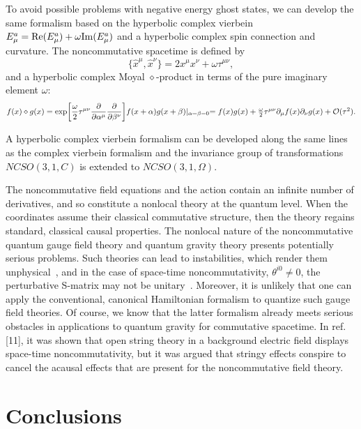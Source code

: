 \documentclass[a4paper,10pt]{article}
\begin{document}
To avoid possible problems with negative energy ghost states, we can
develop the same formalism based on the hyperbolic complex vierbein
$E^a_\mu={\rm Re}(E^a_\mu)+\omega {\rm Im}(E^a_\mu)$ and a hyperbolic
complex spin connection and curvature. The noncommutative spacetime is
defined by
\begin{equation}
\{{\hat x}^\mu, {\hat x}^\nu\}=2x^\mu x^\nu+\omega\tau^{\mu\nu},
\end{equation}
and a hyperbolic complex Moyal $\diamond$-product in terms of the pure
imaginary element $\omega$:
\begin{equation}
f(x)\diamond g(x)
=\exp\biggl[\frac{\omega}{2}\tau^{\mu\nu}\frac{\partial}{\partial\alpha^\mu}
\frac{\partial}{\partial\beta^\nu}\biggr]f(x+\alpha)g(x+\beta)\vert_{\alpha=\beta=0}
$$
$$
=f(x)g(x)+\frac{\omega}{2}\tau^{\mu\nu}\partial_\mu f(x)\partial_\nu
g(x)+{\cal O}(\tau^2).
\end{equation}

A hyperbolic complex vierbein formalism can be developed along the same
lines as the complex vierbein formalism and the invariance group of
transformations $NCSO(3,1,C)$ is extended to $NCSO(3,1,\Omega)$.

The noncommutative field equations and the action contain an infinite
number of derivatives, and so constitute a nonlocal theory at the quantum
level. When the coordinates assume their classical commutative structure,
then the theory regains standard, classical causal properties.
The nonlocal nature of the noncommutative quantum gauge field theory and
quantum gravity theory presents potentially serious problems. Such theories
can lead to instabilities, which render them
unphysical~\cite{Woodard}, and in the case of space-time
noncommutativity, $\theta^{i0}\not=0$, the perturbative S-matrix may not be
unitary~\cite{Gomis}. Moreover, it is unlikely that one can apply the
conventional, canonical Hamiltonian formalism to quantize such gauge field
theories. Of course, we know that the latter formalism already meets
serious obstacles in applications to quantum gravity for commutative
spacetime. In ref. [11], it was shown that open string theory in a 
background electric field displays space-time noncommutativity, but it was
argued that stringy effects conspire to cancel the acausal effects that are
present for the noncommutative field theory.
\section{Conclusions}
\end{document}
